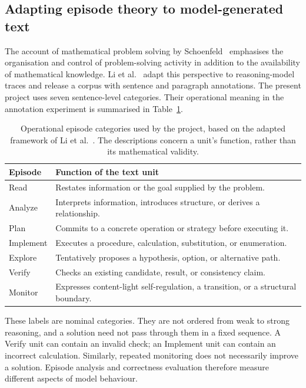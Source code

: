\documentclass[12pt,a4paper,twoside,openright]{book}
\begin{document}
\subsection{Adapting episode theory to model-generated text}

The account of mathematical problem solving by
Schoenfeld~\cite{schoenfeld1985problem} emphasises the organisation and control
of problem-solving activity in addition to the availability of mathematical knowledge.
Li et al.~\cite{li2025schoenfeld} adapt this perspective to reasoning-model
traces and release a corpus with sentence and paragraph annotations.
The present project uses seven sentence-level categories. Their operational
meaning in the annotation experiment is summarised in
Table~\ref{tab:episode-labels}.

\begin{table}[!ht]
  \centering
  \small
  \caption{Operational episode categories used by the project, based on the
  adapted framework of Li et al.~\cite{li2025schoenfeld}. The descriptions
  concern a unit's function, rather than its mathematical validity.}
  \label{tab:episode-labels}
  \begin{tabularx}{\textwidth}{@{}lX@{}}
    \toprule
    Episode & Function of the text unit \\
    \midrule
    Read & Restates information or the goal supplied by the problem. \\
    Analyze & Interprets information, introduces structure, or derives a
      relationship. \\
    Plan & Commits to a concrete operation or strategy before executing it. \\
    Implement & Executes a procedure, calculation, substitution, or enumeration. \\
    Explore & Tentatively proposes a hypothesis, option, or alternative path. \\
    Verify & Checks an existing candidate, result, or consistency claim. \\
    Monitor & Expresses content-light self-regulation, a transition, or a
      structural boundary. \\
    \bottomrule
  \end{tabularx}
\end{table}

These labels are nominal categories. They are not ordered from weak to strong
reasoning, and a solution need not pass through them in a fixed sequence.
A Verify unit can contain an invalid check; an Implement unit can contain an
incorrect calculation. Similarly, repeated monitoring does not necessarily
improve a solution. Episode analysis and correctness evaluation therefore
measure different aspects of model behaviour.
\end{document}
